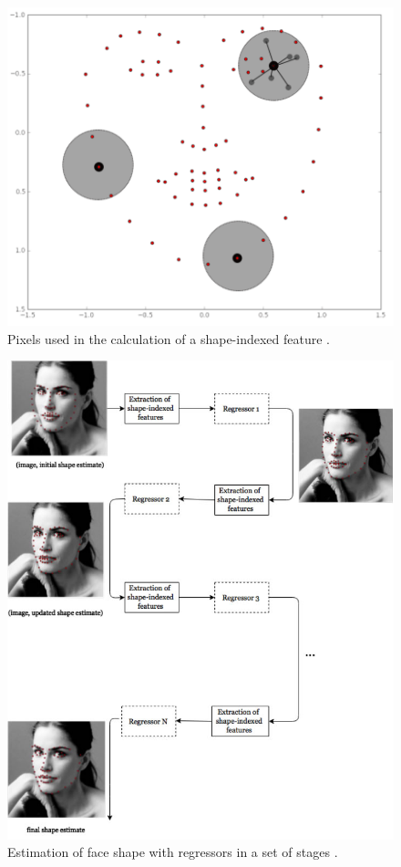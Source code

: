\begin{figure}[h]
    \centering
    \includegraphics[width=0.5\linewidth]{figures/shape-indexed.png}
    \caption{Pixels used in the calculation of a shape-indexed feature \parencite{maris2015}.}
    \label{fig:shape-indexed}
\end{figure}

\begin{figure}[h]
    \centering
    \includegraphics[width=0.9\linewidth]{figures/cascade-explanation.jpg}
    \caption{Estimation of face shape with regressors in a set of stages \parencite{maris2015}.}
    \label{fig:regressor-steps}
\end{figure}

